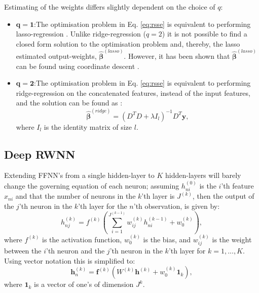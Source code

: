 \documentclass[
]{jss}
\begin{document}
Estimating of the weights differs slightly dependent on the choice of
\(q\):

\begin{itemize}
\item
  \underline{$\boldsymbol{q = 1}$}:\newline  The optimisation problem in
  Eq. \eqref{eq:rsse} is equivalent to performing lasso-regression
  \citep[\citet{TibLasso}]{SanLasso}. Unlike ridge-regression
  (\(q = 2\)) it is not possible to find a closed form solution to the
  optimisation problem and, thereby, the lasso estimated output-weights,
  \(\hat{\boldsymbol{\beta}}^{(lasso)}\). However, it has been shown
  that \(\hat{\boldsymbol{\beta}}^{(lasso)}\) can be found using
  coordinate descent \citep{CoordLasso}.
\item
  \underline{$\boldsymbol{q = 2}$}:\newline  The optimisation problem in
  Eq. \eqref{eq:rsse} is equivalent to performing ridge-regression on
  the concatenated features, instead of the input features, and the
  solution can be found as \citep{ridgeReg}: \begin{equation}
  \hat{\boldsymbol \beta}^{(ridge)} = \left(D^TD + \lambda I_{l}\right)^{-1}D^T\boldsymbol y,
  \end{equation} where \(I_{l}\) is the identity matrix of size \(l\).
\end{itemize}

\hypertarget{deepRWNN}{%
\subsection{Deep RWNN}\label{deepRWNN}}

Extending FFNN's from a single hidden-layer to \(K\) hidden-layers will
barely change the governing equation of each neuron; assuming
\(h_{ni}^{(0)}\) is the \(i\)'th feature \(x_{ni}\) and that the number
of neurons in the \(k\)'th layer is \(J^{(k)}\), then the output of the
\(j\)'th neuron in the \(k\)'th layer for the \(n\)'th observation, is
given by: \begin{equation}
    h_{nj}^{(k)} = f^{(k)}\left(\sum_{i = 1}^{J^{(k - 1)}} w^{(k)}_{ij} h_{ni}^{(k - 1)} + w^{(k)}_{0}\right), \label{eq:hidden2} 
\end{equation} where \(f^{(k)}\) is the activation function,
\(w^{(k)}_0\) is the bias, and \(w^{(k)}_{ij}\) is the weight between
the \(i\)'th neuron and the \(j\)'th neuron in the \(k\)'th layer for
\(k = 1, ..., K\). Using vector notation this is simplified to:
\begin{equation}
    \boldsymbol h_n^{(k)} = \boldsymbol f^{(k)}\left(W^{(k)} \boldsymbol{h}^{(k)} + w^{(k)}_0 \boldsymbol{1}_{k}\right),
\end{equation} where \(\boldsymbol{1}_k\) is a vector of one's of
dimension \(J^{k}\).
\end{document}
